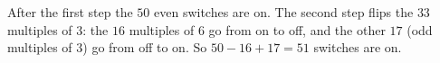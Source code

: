 After the first step the $50$ even switches are on. The second step flips the $33$ multiples of $3$: the $16$ multiples of $6$ go from on to off, and the other $17$ (odd multiples of $3$) go from off to on. So $50-16+17=\boxed{51}$ switches are on.
